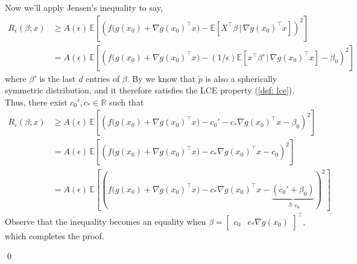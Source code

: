 \documentclass[11pt]{article}
\begin{document}
Now we'll apply Jensen's inequality to say,
\begin{align*}
    R_{\epsilon}(\beta; x) &\geq A( \epsilon)\,\mathbb{E}\left[\left(f\Big(g(x_0) + \nabla g(x_0)^{\top}x\Big)-\mathbb{E}\left[X^{\top}\beta \, \Big| 
    \, \nabla g(x_0)^{\top}x\right]\right)^2\right] \\
    &= A( \epsilon)\,\mathbb{E}\left[\left(f\Big( g(x_0) + \nabla g(x_0)^{\top}x\Big)-(1/\epsilon)\mathbb{E}\left[x^{\top}\beta' \, \Big| 
    \, \nabla g(x_0)^{\top}x\right]- \beta_0\right)^2\right]
\end{align*}
where $\beta'$ is the last $d$ entries of $\beta$. By  we know that $\tilde{p}$ is also a spherically symmetric distribution, and it therefore satisfies the LCE property (\cref{def: lce}). Thus, there exist $c_0', c_* \in \mathbb{R}$ such that 
\begin{align}
    R_{\epsilon}(\beta; x) &\geq A( \epsilon)\,\mathbb{E}\left[\left(f\Big(g(x_0) + \nabla g(x_0)^{\top}x\Big)-c_0' - c_*\nabla g(x_0)^{\top}x - \beta_0\right)^2\right] \\
    &=  A( \epsilon)\,\mathbb{E}\left[\left(f\Big(g(x_0) + \nabla g(x_0)^{\top}x\Big) - c_*\nabla g(x_0)^{\top}x - c_0\right)^2\right] \\
    &= A( \epsilon)\,\mathbb{E}\left[\left(f\Big(g(x_0) + \nabla g(x_0)^{\top}x\Big) - c_*\nabla g(x_0)^{\top}x - \underbrace{(c_0' + \beta_0)}_{\triangleq c_0}\right)^2\right]\label{eq: surrogate risk lower bound}
\end{align}
Observe that the inequality becomes an equality when $\beta = \begin{bmatrix}c_0  & c_*\nabla g(x_0) \end{bmatrix}^{\top}$, which completes the proof.

\qed{}
\end{document}
